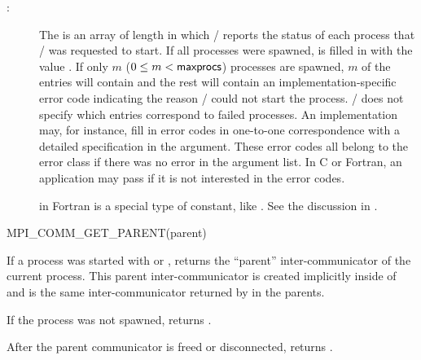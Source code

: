 \begin{description}
\item[:]
The  is an array of length 
in which \MPI/ reports the status of each process that
\MPI/ was requested to start. If all  processes were spawned,
 is filled in with the value
. If only $m$ ($0 \leq m < \mpiarg{maxprocs}$)
processes are spawned, $m$ of the entries will contain
 and the rest will contain
an implementation-specific error code indicating the
reason \MPI/ could not start the process. \MPI/ does not
specify which entries correspond to failed processes.
An implementation may, for instance, fill in
error codes in one-to-one correspondence with
a detailed specification in the 
argument. These error codes
all belong to the error class 
if there was no error in the argument list.
In C or
Fortran,
an application may pass 
if it is not interested in the error codes.
\begin{implementors}
 in Fortran is a special type
of constant, like .
See the discussion in .
\end{implementors}
\end{description}

\begin{funcdef}{MPI\_COMM\_GET\_PARENT}{(\mbox{parent})}
\end{funcdef}

If a process was started with  or\flushline
{},
 returns the ``parent'' inter-communicator
of the current process. This parent inter-communicator is created
implicitly inside of  and is the same
inter-communicator returned by  in the parents.

If the process was not spawned, 
returns .

After the parent communicator is freed or disconnected, 
returns .

